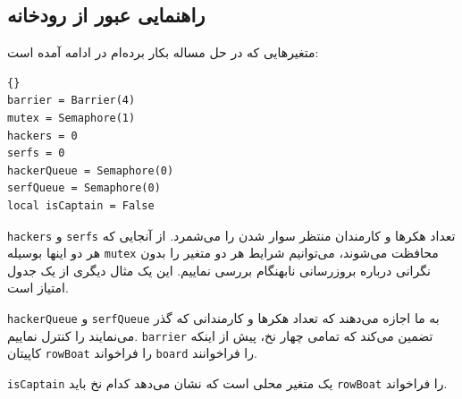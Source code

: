 \documentclass{book}
\newcommand{\clearemptydoublepage}{\newpage\cleardoublepage}
\begin{document}
\clearemptydoublepage
\subsection {راهنمایی عبور از رودخانه}

    متغیرهایی که در حل مساله بکار برده‌ام در ادامه آمده است:‌

\begin{latin}
\begin{latin}
\begin{lstlisting}[title=\rl{راهنمایی عبور از رودخانه}]{}
barrier = Barrier(4)
mutex = Semaphore(1)
hackers = 0
serfs = 0
hackerQueue = Semaphore(0)
serfQueue = Semaphore(0)
local isCaptain = False
\end{lstlisting}
\end{latin}
\end{latin}

    {\tt hackers} و {\tt serfs}
    تعداد هکرها و کارمندان منتظر سوار شدن را می‌شمرد. از آنجایی که هر دو اینها بوسیله {\tt mutex} محافظت می‌شوند، می‌توانیم شرایط هر دو متغیر را 
    بدون نگرانی درباره بروزرسانی‌ نابهنگام بررسی نماییم. این یک مثال دیگری از یک جدول امتیاز است. 


    {\tt hackerQueue} و {\tt serfQueue}
    به ما اجازه می‌دهند که تعداد هکرها و کارمندانی که گذر می‌نمایند را کنترل نماییم. {\tt barrier} تضمین می‌کند که تمامی چهار نخ، پیش از اینکه 
    کاپیتان  {\tt rowBoat} را فراخواند  {\tt board}  را فراخوانند. 

    {\tt isCaptain} یک متغیر محلی است که نشان می‌دهد کدام نخ باید {\tt rowBoat} را فراخواند. 
\end{document}
